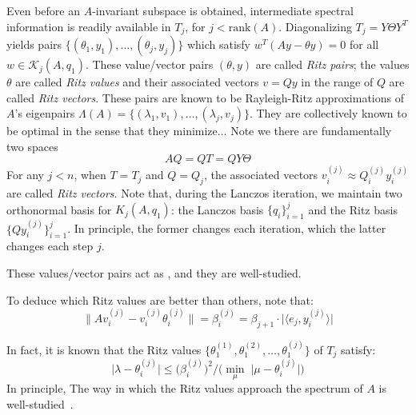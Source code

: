 \documentclass[10pt]{article}
\newcommand{\+}{%
	\raisebox{0.18ex}{\scaleobj{0.55}{+}}
}
\theoremstyle{definition}
\begin{document}

Even before an $A$-invariant subspace is obtained, intermediate spectral information is readily available in $T_j$, for $j < \mathrm{rank}(A)$. 
Diagonalizing $T_j = Y \Theta Y^T$ yields pairs $\{  (\theta_1, y_1), \dots, (\theta_j, y_j) \}$ which satisfy $w^T (Ay - \theta y) = 0$ for all $w \in \mathcal{K}_j(A, q_1)$.
These value/vector pairs $(\theta, y)$ are called \emph{Ritz pairs}; the values $\theta$ are called \emph{Ritz values} and their associated vectors $v = Q y$ in the range of $Q$ are called \emph{Ritz vectors}. These pairs are known to be Rayleigh-Ritz approximations of $A$'s eigenpairs $\Lambda(A) = \{  (\lambda_1, v_1), \dots, (\lambda_j, v_j) \}$. They are collectively known to be optimal in the sense that they minimize... 
Note we there are fundamentally two spaces 
$$ A Q = Q T = Q Y \Theta $$
For any $j < n$, when $T = T_j$ and $Q = Q_j$, the associated vectors $v_i^{(j)} \approx Q_i^{(j)}  y_i^{(j)}$ are called \emph{Ritz vectors}. 
Note that, during the Lanczos iteration, we maintain two orthonormal basis for $K_j(A, q_1)$: the Lanczos basis $\{q _i\}_{i=1}^j$ and the Ritz basis $\{ Q y_i^{(j)} \}_{i=1}^{j}$. In principle, the former changes each iteration, which the latter changes each step $j$.  


These values/vector pairs act as , and they are well-studied.


To deduce which Ritz values are better than others, note that: 
\begin{equation}
	\lVert A v_i^{(j)} - v_i^{(j)} \theta_i^{(j)} \rVert = \beta_i^{(j)} = \beta_{j+1} \cdot \lvert \langle e_j, y_i^{(j)} \rangle   \rvert 
\end{equation}
 
In fact, it is known that the Ritz values $\{ \theta_1^{(1)}, \theta_1^{(2)}, \dots, \theta_1^{(j)} \}$ of $T_j$ satisfy: 
 \begin{equation}
 	\lvert \lambda - \theta_i^{(j)} \rvert \leq \big ( \beta_i^{(j)} \big )^2 / \big( \min_\mu \; \lvert \mu - \theta_i^{(j)} \rvert \big ) 
 \end{equation}
In principle, 
The way in which the Ritz values approach the spectrum of $A$ is well-studied~\cite{}.
\end{document}
